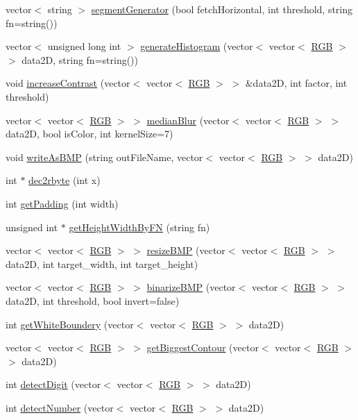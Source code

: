 \begin{DoxyCompactItemize}
\item 
vector$<$ string $>$ \hyperlink{class_b_m_p_ae6489ffa6e4f5054d0f79c0060a5ce5e}{segment\+Generator} (bool fetch\+Horizontal, int threshold, string fn=string())
\item 
vector$<$ unsigned long int $>$ \hyperlink{class_b_m_p_abfba756268553a144e4d438cf08cfd88}{generate\+Histogram} (vector$<$ vector$<$ \hyperlink{class_r_g_b}{R\+GB} $>$ $>$ data2D, string fn=string())
\item 
void \hyperlink{class_b_m_p_a29b13b8d85e3db52f410c2bc54e22c87}{increase\+Contrast} (vector$<$ vector$<$ \hyperlink{class_r_g_b}{R\+GB} $>$ $>$ \&data2D, int factor, int threshold)
\item 
vector$<$ vector$<$ \hyperlink{class_r_g_b}{R\+GB} $>$ $>$ \hyperlink{class_b_m_p_a6c6d8ef070464b74d054f39d6b435247}{median\+Blur} (vector$<$ vector$<$ \hyperlink{class_r_g_b}{R\+GB} $>$ $>$ data2D, bool is\+Color, int kernel\+Size=7)
\item 
void \hyperlink{class_b_m_p_aa9269f0d792e39faed57347394d530ee}{write\+As\+B\+MP} (string out\+File\+Name, vector$<$ vector$<$ \hyperlink{class_r_g_b}{R\+GB} $>$ $>$ data2D)
\item 
int $\ast$ \hyperlink{class_b_m_p_a9c1b98bda85628da0f3bbafdbcd097cb}{dec2rbyte} (int x)
\item 
int \hyperlink{class_b_m_p_ad7557c0db332d88d72e447d7d09db40f}{get\+Padding} (int width)
\item 
unsigned int $\ast$ \hyperlink{class_b_m_p_a12db9e6e65cf96c976f572310b500e12}{get\+Height\+Width\+By\+FN} (string fn)
\item 
vector$<$ vector$<$ \hyperlink{class_r_g_b}{R\+GB} $>$ $>$ \hyperlink{class_b_m_p_a685e5a78e475fcfc845c08650b3ae54d}{resize\+B\+MP} (vector$<$ vector$<$ \hyperlink{class_r_g_b}{R\+GB} $>$ $>$ data2D, int target\+\_\+width, int target\+\_\+height)
\item 
vector$<$ vector$<$ \hyperlink{class_r_g_b}{R\+GB} $>$ $>$ \hyperlink{class_b_m_p_a06087ef29abfac7f68d8afaa4cbaec81}{binarize\+B\+MP} (vector$<$ vector$<$ \hyperlink{class_r_g_b}{R\+GB} $>$ $>$ data2D, int threshold, bool invert=false)
\item 
int \hyperlink{class_b_m_p_ab6913a6a4590e85617e5dae596b703fd}{get\+White\+Boundery} (vector$<$ vector$<$ \hyperlink{class_r_g_b}{R\+GB} $>$ $>$ data2D)
\item 
vector$<$ vector$<$ \hyperlink{class_r_g_b}{R\+GB} $>$ $>$ \hyperlink{class_b_m_p_a9effe0ed9f879248f6084cfea74095ae}{get\+Biggest\+Contour} (vector$<$ vector$<$ \hyperlink{class_r_g_b}{R\+GB} $>$ $>$ data2D)
\item 
int \hyperlink{class_b_m_p_a0fdda9df1614f44bee93d2e4ca6e37c2}{detect\+Digit} (vector$<$ vector$<$ \hyperlink{class_r_g_b}{R\+GB} $>$ $>$ data2D)
\item 
int \hyperlink{class_b_m_p_ad08fcac55ed0ffd703208921e1d47804}{detect\+Number} (vector$<$ vector$<$ \hyperlink{class_r_g_b}{R\+GB} $>$ $>$ data2D)
\end{DoxyCompactItemize}



